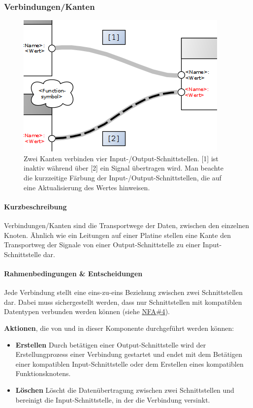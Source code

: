 
\subsubsection{Verbindungen/Kanten}
\begin{figure}[h]
  \centering
  \includegraphics[width=.6\textwidth]{bilder/chapter4/chapter4_3/links.png}
  \caption{Zwei Kanten verbinden vier Input-/Output-Schnittstellen. [1] ist inaktiv während über [2] ein Signal übertragen wird. Man beachte die kurzzeitige Färbung der Input-/Output-Schnittstellen, die auf eine Aktualisierung des Wertes hinweisen.}
  \label{fig:genericlink}
\end{figure}


\paragraph{Kurzbeschreibung} Verbindungen/Kanten sind die Transportwege der Daten, zwischen den einzelnen Knoten. Ähnlich wie ein Leitungen auf einer Platine stellen eine Kante den Transportweg der Signale von einer Output-Schnittstelle zu einer Input-Schnittstelle dar.

\paragraph{Rahmenbedingungen \& Entscheidungen} Jede Verbindung stellt eine eins-zu-eins Beziehung zwischen zwei Schnittstellen dar. Dabei muss sichergestellt werden, dass nur Schnittstellen mit kompatiblen Datentypen verbunden werden können (siehe \hyperref[tab:NFA4]{NFA\#4}). 

\textbf{Aktionen}, die von und in dieser Komponente durchgeführt werden können: 
\begin{itemize}
    \item \textbf{Erstellen} Durch betätigen einer Output-Schnittstelle wird der Erstellungprozess einer Verbindung gestartet und endet mit dem Betätigen einer kompatiblen Input-Schnittstelle oder dem Erstellen eines kompatiblen Funktionsknotens.
    \item \textbf{Löschen} Löscht die Datenübertragung zwischen zwei Schnittstellen und bereinigt die Input-Schnittstelle, in der die Verbindung versinkt.
\end{itemize}

